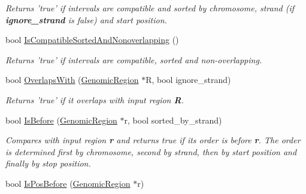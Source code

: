\begin{CompactItemize}
\begin{CompactList}\small\item\em Returns 'true' if intervals are compatible and sorted by chromosome, strand (if {\bf ignore\_\-strand} is false) and start position. \item\end{CompactList}\item 
\hypertarget{classGenomicRegion_fb2db74a3cd85a84533375483e12b96c}{
bool \hyperlink{classGenomicRegion_fb2db74a3cd85a84533375483e12b96c}{IsCompatibleSortedAndNonoverlapping} ()}
\label{classGenomicRegion_fb2db74a3cd85a84533375483e12b96c}

\begin{CompactList}\small\item\em Returns 'true' if intervals are compatible, sorted and non-overlapping. \item\end{CompactList}\item 
\hypertarget{classGenomicRegion_821c468713f787b3d821af7edaab41dc}{
bool \hyperlink{classGenomicRegion_821c468713f787b3d821af7edaab41dc}{OverlapsWith} (\hyperlink{classGenomicRegion}{GenomicRegion} $\ast$R, bool ignore\_\-strand)}
\label{classGenomicRegion_821c468713f787b3d821af7edaab41dc}

\begin{CompactList}\small\item\em Returns 'true' if it overlaps with input region {\bf R}. \item\end{CompactList}\item 
\hypertarget{classGenomicRegion_25634257eb7a2ed379548b17a83414fb}{
bool \hyperlink{classGenomicRegion_25634257eb7a2ed379548b17a83414fb}{IsBefore} (\hyperlink{classGenomicRegion}{GenomicRegion} $\ast$r, bool sorted\_\-by\_\-strand)}
\label{classGenomicRegion_25634257eb7a2ed379548b17a83414fb}

\begin{CompactList}\small\item\em Compares with input region {\bf r} and returns true if its order is before {\bf r}. The order is determined first by chromosome, second by strand, then by start position and finally by stop position. \item\end{CompactList}\item 
\hypertarget{classGenomicRegion_2065cf74a82c2340b1e49e7f7ec0fdd4}{
bool \hyperlink{classGenomicRegion_2065cf74a82c2340b1e49e7f7ec0fdd4}{IsPosBefore} (\hyperlink{classGenomicRegion}{GenomicRegion} $\ast$r)}
\label{classGenomicRegion_2065cf74a82c2340b1e49e7f7ec0fdd4}


\end{CompactItemize}
